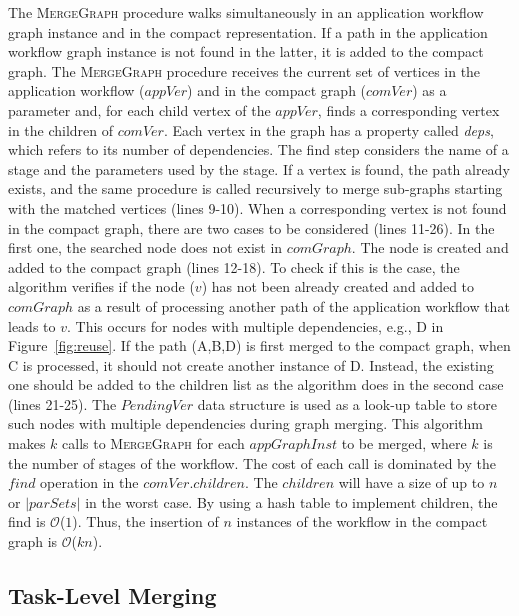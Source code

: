 The {\scshape MergeGraph} procedure walks simultaneously in an application workflow graph instance and in the compact representation. If a path in the application workflow graph instance is not found in the latter, it is added to the compact graph.  The {\scshape MergeGraph} procedure receives the current set of vertices in the application workflow ($appVer$) and in the compact graph ($comVer$) as a parameter and, for each child vertex of the $appVer$, finds a corresponding vertex in the children of $comVer$. Each vertex in the graph has a property called {\em deps}, which refers to its number of dependencies. The find step considers the name of a stage and the parameters used by the stage. If a vertex is found, the path already exists, and the same procedure is called recursively to merge sub-graphs starting with the matched vertices (lines 9-10). When a corresponding vertex is not found in the compact graph, there are two cases to be considered (lines 11-26). In the first one, the searched node does not exist in $comGraph$. The node is created and added to the compact graph (lines 12-18). To check if this is the case, the algorithm verifies if the node ($v$) has not been already created and added to $comGraph$ as a result of processing another path of the application workflow that leads to $v$. This occurs for nodes with multiple dependencies, e.g., D in Figure~\ref{fig:reuse}. If the path (A,B,D) is first merged to the compact graph, when C is processed, it should not create another instance of D. Instead, the existing one should be added to the children list as the algorithm does in the second case (lines 21-25). The $PendingVer$ data structure is used as a look-up table to store such nodes with multiple dependencies during graph merging. This algorithm makes $k$ calls to {\scshape MergeGraph} for each $appGraphInst$ to be merged, where $k$ is the number of stages of the workflow. The cost of each call is dominated by the $find$ operation in the $comVer.children$. The $children$ will have a size of up to $n$ or $|parSets|$ in the worst case. By using a hash table to implement children, the find is $\mathcal{O}$($1$). Thus, the insertion of $n$ instances of the workflow in the compact graph is $\mathcal{O}$($kn$).



\subsection{Task-Level Merging}

